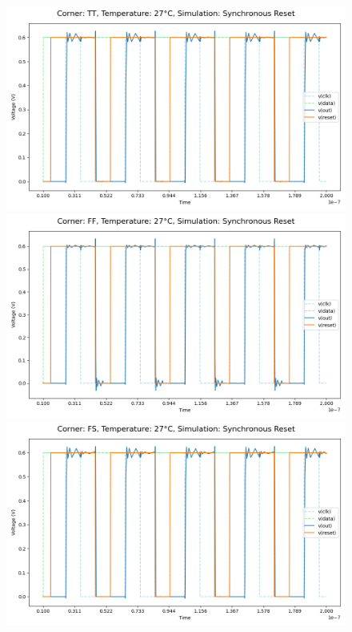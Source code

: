 \begin{figure}[H]
    \centering
    \includegraphics[height= 0.21\textheight]{figures/aimspice/0.600_0.1u_0.1u_0.3u_0.1u/functionality/TT27W3.png}
    \vspace{5pt}
    \includegraphics[height= 0.21\textheight]{figures/aimspice/0.600_0.1u_0.1u_0.3u_0.1u/functionality/FF27W3.png}
    \vspace{5pt}
    \includegraphics[height= 0.21\textheight]{figures/aimspice/0.600_0.1u_0.1u_0.3u_0.1u/functionality/FS27W3.png}

\end{figure}
